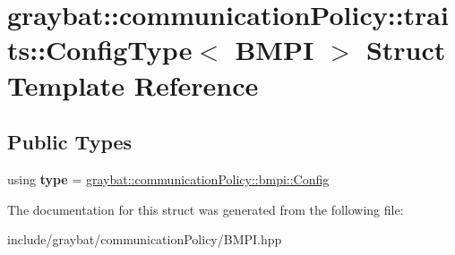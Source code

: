 \hypertarget{structgraybat_1_1communicationPolicy_1_1traits_1_1ConfigType_3_01BMPI_01_4}{}\section{graybat\+:\+:communication\+Policy\+:\+:traits\+:\+:Config\+Type$<$ B\+M\+P\+I $>$ Struct Template Reference}
\label{structgraybat_1_1communicationPolicy_1_1traits_1_1ConfigType_3_01BMPI_01_4}
\subsection*{Public Types}
\begin{DoxyCompactItemize}
\item 
\hypertarget{structgraybat_1_1communicationPolicy_1_1traits_1_1ConfigType_3_01BMPI_01_4_ac664d107e4c9a02a792f210e04482160}{}using {\bfseries type} = \hyperlink{structgraybat_1_1communicationPolicy_1_1bmpi_1_1Config}{graybat\+::communication\+Policy\+::bmpi\+::\+Config}\label{structgraybat_1_1communicationPolicy_1_1traits_1_1ConfigType_3_01BMPI_01_4_ac664d107e4c9a02a792f210e04482160}

\end{DoxyCompactItemize}


The documentation for this struct was generated from the following file\+:\begin{DoxyCompactItemize}
\item 
include/graybat/communication\+Policy/B\+M\+P\+I.\+hpp\end{DoxyCompactItemize}
